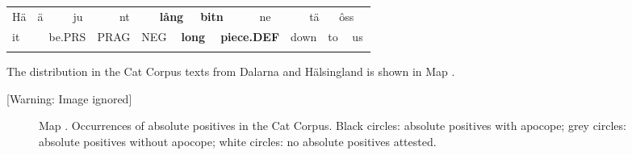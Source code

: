 \begin{tabular}{llllllllllllllllll}
\lsptoprule
Hä & \multicolumn{2}{l}{ä

} & \multicolumn{2}{l}{ju

} & \multicolumn{2}{l}{nt

} & \multicolumn{2}{l}{{\bfseries lång}

} & \multicolumn{2}{l}{{\bfseries bitn}

} & \multicolumn{2}{l}{ne

} & \multicolumn{2}{l}{tä

} & \multicolumn{2}{l}{ôss

} & \\
\multicolumn{2}{l}{it

} & \multicolumn{2}{l}{be.PRS

} & \multicolumn{2}{l}{PRAG

} & \multicolumn{2}{l}{NEG

} & \multicolumn{2}{l}{{\bfseries long}

} & \multicolumn{2}{l}{{\bfseries piece.DEF}

} & \multicolumn{2}{l}{down

} & \multicolumn{2}{l}{to

} & \multicolumn{2}{l}{us

}\\
\lspbottomrule
\end{tabular}

The distribution in the Cat Corpus texts from Dalarna and Hälsingland is shown in Map .

  [Warning: Image ignored] %
 

\begin{stylecaption}

\end{stylecaption}

\begin{figure}[h]

\begin{minipage}{3.6772in}

\begin{stylecaption}
Map . Occurrences of absolute positives in the Cat Corpus. Black circles: absolute positives with apocope; grey circles: absolute positives without apocope; white circles: no absolute positives attested.

\end{stylecaption}

\end{minipage}

\end{figure}
